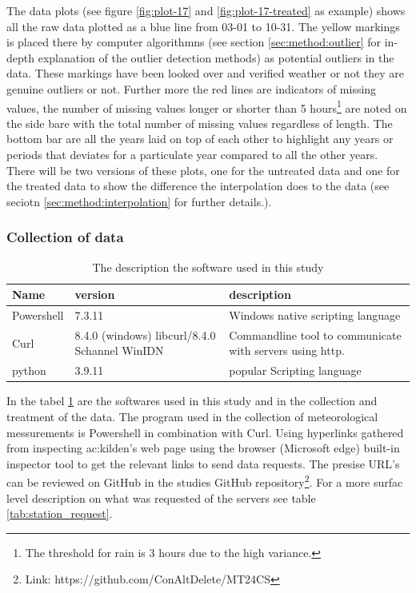 The data plots (see figure \ref{fig:plot-17} and \ref{fig:plot-17-treated} as example) shows all the raw data plotted as a blue line from 03-01 to 10-31. The yellow markings is placed there by computer algorithmns (see section \ref{sec:method:outlier} for in-depth explanation of the outlier detection methods) as potential outliers in the data. These markings have been looked over and verified weather or not they are genuine outliers or not. Further more the red lines are indicators of missing values, the number of missing values longer or shorter than 5 hours\footnote{The threshold for rain is 3 hours due to the high variance.} are noted on the side bare with the total number of missing values regardless of length. The bottom bar are all the years laid on top of each other to highlight any years or periods that deviates for a particulate year compared to all the other years. There will be two versions of these plots, one for the untreated data and one for the treated data to show the difference the interpolation does to the data (see seciotn \ref{sec:method:interpolation} for further details.).

\subsubsection{Collection of data}

\begin{table}
	\begin{tabular}{l|p{3cm}|p{3cm}}
		Name       &version&                       description                        \\ \hline
		Powershell &7.3.11 & Windows native scripting language \\\hline
		Curl       & 8.4.0 (windows) libcurl/8.4.0 Schannel WinIDN & Commandline tool to communicate with servers using http. \\\hline
		python     &                    3.9.11                     &                popular Scripting language
	\end{tabular}
	\caption[software version description]{The description the software used in this study}
	\label{tab:software}
\end{table}

In the tabel \ref{tab:software} are the softwares used in this study and in the collection and treatment of the data. The program used in the collection of meteorological messurements is Powershell in combination with Curl. Using hyperlinks gathered from inspecting \acrshort{ac:kilden}'s web page using the browser (Microsoft edge) built-in inspector tool to get the relevant links to send data requests. The presise URL's can be reviewed on GitHub in the studies GitHub repository\footnote{Link: https://github.com/ConAltDelete/MT24CS}. For a more surfac level description on what was requested of the servers see table \ref{tab:station_request}.

